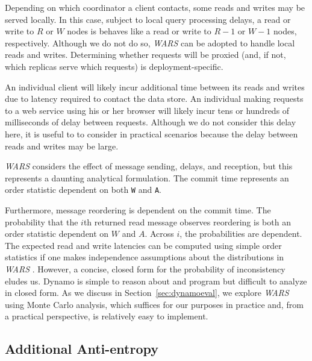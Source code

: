 \documentclass{vldb}
\begin{document}
Depending on which coordinator a client contacts, some reads and
writes may be served locally.  In this case, subject to local query
processing delays, a read or write to $R$ or $W$ nodes is behaves like
a read or write to $R-1$ or $W-1$ nodes, respectively.  Although we do
not do so, \textit{WARS} can be adopted to handle local reads and
writes.  Determining whether requests will be proxied (and, if not,
which replicas serve which requests) is deployment-specific.

An individual client will likely incur additional time between its
reads and writes due to latency required to contact the data store.
An individual making requests to a web service using his or her
browser will likely incur tens or hundreds of milliseconds of delay
between requests.  Although we do not consider this delay here, it is
useful to to consider in practical scenarios because the delay between
reads and writes may be large.

\textit{WARS} considers the effect of message sending, delays, and
reception, but this represents a daunting analytical formulation.  The
commit time represents an order statistic dependent on both \texttt{W}
and \texttt{A}.  Furthermore, message reordering is
dependent on the commit time.  The probability that the $i$th returned
read message observes reordering is both an order statistic dependent
on $W$ and $A$.  Across $i$, the probabilities are dependent.  The
expected read and write latencies can be computed using simple order
statistics if one makes independence assumptions about the
distributions in \textit{WARS} .  However, a concise, closed form for
the probability of inconsistency eludes us.  Dynamo is simple to
reason about and program but difficult to analyze in closed form.  As
we discuss in Section~\ref{sec:dynamoeval}, we explore \textit{WARS}
using Monte Carlo analysis, which suffices for our purposes in
practice and, from a practical perspective, is relatively easy to
implement.

\subsection{Additional Anti-entropy}
\end{document}
